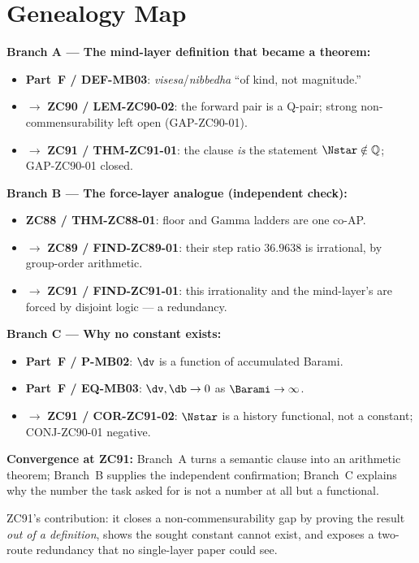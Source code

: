 \documentclass[12pt, a4paper]{article}
\begin{document}
\section{Genealogy Map}
\label{sec:genealogy-zc91}
\begin{genealogybox}[title={How ZC91's Key Objects Trace Back}]

\textbf{Branch A --- The mind-layer definition that became a theorem:}
\begin{itemize}[leftmargin=2em, noitemsep]
  \item \textbf{Part~F / DEF-MB03}: \emph{visesa}/\emph{nibbedha} ``of
    kind, not magnitude.''
  \item $\to$ \textbf{ZC90 / LEM-ZC90-02}: the forward pair is a Q-pair;
    strong non-commensurability left open (GAP-ZC90-01).
  \item $\to$ \textbf{ZC91 / THM-ZC91-01}: the clause \emph{is} the
    statement $\Nstar\notin\mathbb{Q}$; GAP-ZC90-01 closed.
\end{itemize}

\textbf{Branch B --- The force-layer analogue (independent check):}
\begin{itemize}[leftmargin=2em, noitemsep]
  \item \textbf{ZC88 / THM-ZC88-01}: floor and Gamma ladders are one
    co-AP.
  \item $\to$ \textbf{ZC89 / FIND-ZC89-01}: their step ratio
    $36.9638$ is irrational, by group-order arithmetic.
  \item $\to$ \textbf{ZC91 / FIND-ZC91-01}: this irrationality and the
    mind-layer's are forced by disjoint logic --- a redundancy.
\end{itemize}

\textbf{Branch C --- Why no constant exists:}
\begin{itemize}[leftmargin=2em, noitemsep]
  \item \textbf{Part~F / P-MB02}: $\dv$ is a function of accumulated
    Barami.
  \item \textbf{Part~F / EQ-MB03}: $\dv,\db\to0$ as $\Barami\to\infty$.
  \item $\to$ \textbf{ZC91 / COR-ZC91-02}: $\Nstar$ is a history
    functional, not a constant; CONJ-ZC90-01 negative.
\end{itemize}

\textbf{Convergence at ZC91:}
Branch~A turns a semantic clause into an arithmetic theorem; Branch~B
supplies the independent confirmation; Branch~C explains why the number
the task asked for is not a number at all but a functional.

ZC91's contribution: it closes a non-commensurability gap by proving the
result \emph{out of a definition}, shows the sought constant cannot exist,
and exposes a two-route redundancy that no single-layer paper could see.
\end{genealogybox}
\end{document}
